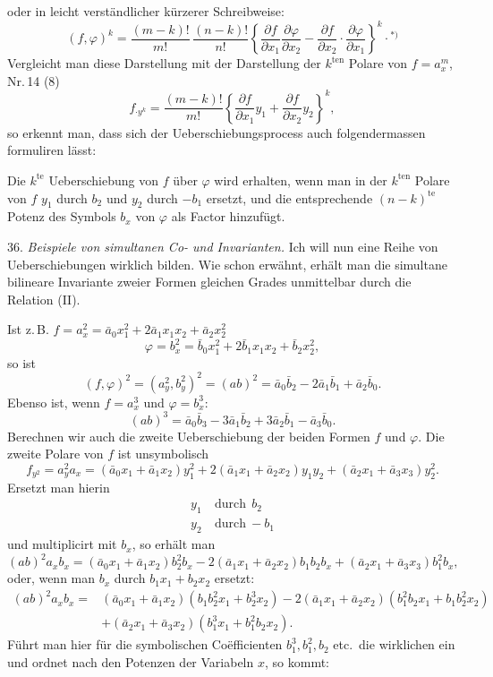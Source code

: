 \documentclass[11pt]{article}
\providecommand{\weberpage}[1]{}
\providecommand{\weq}[2]{\begin{equation}\tag{#1}#2\end{equation}}
\begin{document}
\weberpage{37}
oder in leicht verständlicher kürzerer Schreibweise:
\weq{III}{(f, \varphi)^k = \frac{(m-k)!}{m!}\,\frac{(n-k)!}{n!}\left\{\frac{\partial f}{\partial x_1}\frac{\partial \varphi}{\partial x_2} - \frac{\partial f}{\partial x_2}\cdot\frac{\partial \varphi}{\partial x_1}\right\}^k \cdot{}^{*)}}
Vergleicht man diese Darstellung mit der Darstellung der $k^{\text{ten}}$ Polare von $f=a_x^m$, Nr.\,14 (8)
\[
f_{\cdot y^k} = \frac{(m-k)!}{m!}\left\{\frac{\partial f}{\partial x_1}y_1+\frac{\partial f}{\partial x_2}y_2\right\}^k,
\]
so erkennt man, dass sich der Ueberschiebungsprocess auch folgendermassen formuliren lässt:

\glqq Die $k^{\text{te}}$ Ueberschiebung von $f$ über $\varphi$ wird erhalten, wenn
man in der $k^{\text{ten}}$ Polare von $f$ $y_1$ durch $b_2$ und $y_2$ durch $-b_1$
ersetzt, und die entsprechende $(n-k)^{\text{te}}$ Potenz des Symbols
$b_x$ von $\varphi$ als Factor hinzufügt.\grqq{}

36. \textit{Beispiele von simultanen Co- und Invarianten.} Ich will nun
eine Reihe von Ueberschiebungen wirklich bilden. Wie schon erwähnt,
erhält man die simultane bilineare Invariante zweier Formen gleichen
Grades unmittelbar durch die Relation (II).

Ist z.\,B. $f=a_x^2=\bar a_0x_1^2+2\bar a_1x_1x_2+\bar a_2x_2^2$
\[
\varphi=b_x^2=\bar b_0x_1^2+2\bar b_1x_1x_2+\bar b_2x_2^2,
\]
so ist
\weq{1}{(f,\varphi)^2=(a_y^2,b_y^2)^2=(ab)^2=\bar a_0\bar b_2-2\bar a_1\bar b_1+\bar a_2\bar b_0.}
Ebenso ist, wenn $f=a_x^3$ und $\varphi=b_x^3$:
\weq{2}{(ab)^3=\bar a_0\bar b_3-3\bar a_1\bar b_2+3\bar a_2\bar b_1-\bar a_3\bar b_0.}
Berechnen wir auch die zweite Ueberschiebung der beiden Formen $f$ und
$\varphi$. Die zweite Polare von $f$ ist unsymbolisch
\[
f_{y^2}=a_y^2a_x=(\bar a_0x_1+\bar a_1x_2)y_1^2+2(\bar a_1x_1+\bar a_2x_2)y_1y_2+(\bar a_2x_1+\bar a_3x_3)y_2^2. %
\]
Ersetzt man hierin
\[
\begin{aligned}
y_1 &\ \text{durch}\ \ b_2\\
y_2 &\ \text{durch}\ -b_1
\end{aligned}
\]
und multiplicirt mit $b_x$, so erhält man
\[
(ab)^2a_xb_x=(\bar a_0x_1+\bar a_1x_2)b_2^2b_x-2(\bar a_1x_1+\bar a_2x_2)b_1b_2b_x+(\bar a_2x_1+\bar a_3x_3)b_1^2b_x, %
\]
oder, wenn man $b_x$ durch $b_1x_1+b_2x_2$ ersetzt:
\[
\begin{aligned}
(ab)^2a_xb_x={}&(\bar a_0x_1+\bar a_1x_2)(b_1b_2^2x_1+b_2^3x_2)-2(\bar a_1x_1+\bar a_2x_2)(b_1^2b_2x_1+b_1b_2^2x_2)\\
&+(\bar a_2x_1+\bar a_3x_2)(b_1^3x_1+b_1^2b_2x_2).
\end{aligned}
\]
Führt man hier für die symbolischen Co\"efficienten $b_1^3, b_1^2, b_2$ etc.\ die
wirklichen ein und ordnet nach den Potenzen der Variabeln $x$, so kommt:
\end{document}
